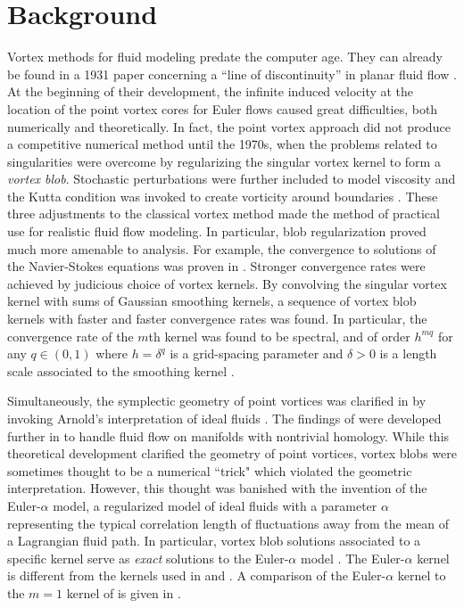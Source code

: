 \documentclass[12pt]{amsart}
\theoremstyle{remark}
\begin{document}
\section{Background}
\label{sec:background}
Vortex methods for fluid modeling predate the computer age. They can already be found in a 1931 paper concerning a ``line of discontinuity'' in planar fluid flow \cite{Rosenhead1931}.
At the beginning of their development, the infinite induced velocity at the location of the point vortex cores for Euler flows caused great difficulties, both numerically and theoretically. In fact, the point vortex approach did not produce a competitive numerical method until the 1970s, when the problems related to singularities were overcome by regularizing the singular vortex kernel to form a \emph{vortex blob}.
Stochastic perturbations were further included to model viscosity and the Kutta condition was invoked to create vorticity around boundaries \cite{Chorin1973}.
These three adjustments to the classical vortex method made the method of practical use for realistic fluid flow modeling.
In particular, blob regularization proved much more amenable to analysis. For example, the convergence to solutions of the Navier-Stokes equations was proven in \cite{Hald1979}.
Stronger convergence rates were achieved by judicious choice of vortex kernels.
By convolving the singular vortex kernel with sums of Gaussian smoothing kernels, a sequence of vortex blob kernels with faster and faster convergence rates was found.
In particular, the convergence rate of the $m$th kernel was found to be spectral, and of order $h^{mq}$ for any $q \in (0,1)$ where $h = \delta^q$
is a grid-spacing parameter and $\delta > 0$ is a length scale associated to the smoothing kernel \cite{BealeMajda1982,BealeMajda1985}.

Simultaneously, the symplectic geometry of point vortices was clarified in \cite{MarsdenWeinstein1983}
by invoking Arnold's interpretation of ideal fluids \cite{Arnold1966}.
The findings of \cite{MarsdenWeinstein1983} were developed further in \cite{GayBalmazVizman2012} to handle fluid flow on manifolds with nontrivial homology.
While this theoretical development clarified the geometry of point vortices, vortex blobs were sometimes thought to be a numerical ``trick" which violated the geometric interpretation.
However, this thought was banished with the invention of the Euler-$\alpha$ model, a regularized model of ideal fluids with a parameter $\alpha$ representing the typical correlation length of fluctuations away from the mean of a Lagrangian fluid path. In particular, vortex blob solutions associated to a specific kernel serve as \emph{exact} solutions to the Euler-$\alpha$ model \cite{OliverShkoller2001}.
The Euler-$\alpha$ kernel is different from the kernels used in \cite{Chorin1973} and \cite{BealeMajda1985}.
A comparison of the Euler-$\alpha$ kernel to the $m=1$ kernel of \cite{BealeMajda1985} is given in \cite{HolmNitschePutkaradze2006}.
\end{document}

